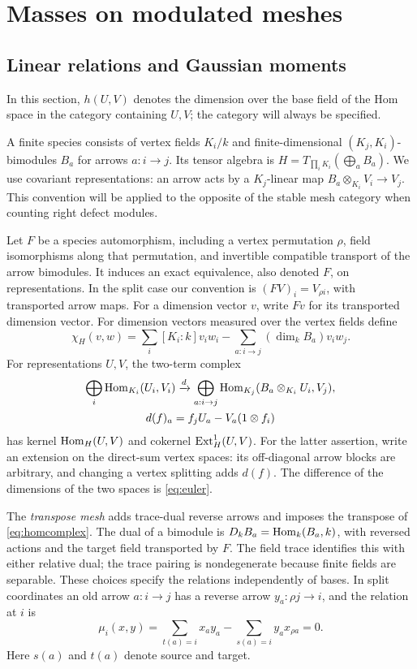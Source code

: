 \section{Masses on modulated meshes}\label{sec:counting}
\subsection{Linear relations and Gaussian moments}
In this section, $h(U,V)$ denotes the dimension over the base field of the Hom space in the category containing $U,V$; the category will always be specified.

A finite species consists of vertex fields $K_i/k$ and finite-dimensional $(K_j,K_i)$-bimodules $B_a$ for arrows $a:i\to j$. Its tensor algebra is $H=T_{\prod_iK_i}(\bigoplus_aB_a)$. We use covariant representations: an arrow acts by a $K_j$-linear map $B_a\otimes_{K_i}V_i\to V_j$. This convention will be applied to the opposite of the stable mesh category when counting right defect modules.

Let $F$ be a species automorphism, including a vertex permutation $\rho$, field isomorphisms along that permutation, and invertible compatible transport of the arrow bimodules. It induces an exact equivalence, also denoted $F$, on representations. In the split case our convention is $(FV)_i=V_{\rho i}$, with transported arrow maps. For a dimension vector $v$, write $Fv$ for its transported dimension vector. For dimension vectors measured over the vertex fields define
\begin{equation}\label{eq:euler}
 \chi_H(v,w)=\sum_i[K_i:k]v_iw_i
 -\sum_{a:i\to j}(\dim_kB_a)v_iw_j.
\end{equation}
For representations $U,V$, the two-term complex
\begin{equation}\label{eq:homcomplex}
 \begin{gathered}
 \bigoplus_i\operatorname{Hom}_{K_i}(U_i,V_i)\xrightarrow{d}
 \bigoplus_{a:i\to j}\operatorname{Hom}_{K_j}(B_a\otimes_{K_i}U_i,V_j),\\
 d(f)_a=f_jU_a-V_a(1\otimes f_i)
 \end{gathered}
\end{equation}
has kernel $\operatorname{Hom}_H(U,V)$ and cokernel $\operatorname{Ext}_H^1(U,V)$. For the latter assertion, write an extension on the direct-sum vertex spaces: its off-diagonal arrow blocks are arbitrary, and changing a vertex splitting adds $d(f)$. The difference of the dimensions of the two spaces is \eqref{eq:euler}.

The \emph{transpose mesh} adds trace-dual reverse arrows and imposes the transpose of \eqref{eq:homcomplex}. The dual of a bimodule is $D_kB_a=\operatorname{Hom}_k(B_a,k)$, with reversed actions and the target field transported by $F$. The field trace identifies this with either relative dual; the trace pairing is nondegenerate because finite fields are separable. These choices specify the relations independently of bases. In split coordinates an old arrow $a:i\to j$ has a reverse arrow $y_a:\rho j\to i$, and the relation at $i$ is
\[
 \mu_i(x,y)=\sum_{t(a)=i}x_a y_a-\sum_{s(a)=i}y_a x_{\rho a}=0.
\]
Here $s(a)$ and $t(a)$ denote source and target.

